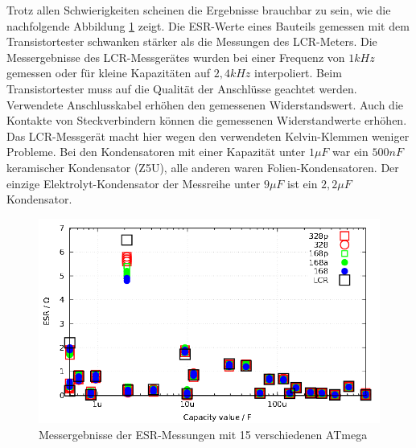 Trotz allen Schwierigkeiten scheinen die Ergebnisse brauchbar zu sein, wie die nachfolgende Abbildung \ref{fig:Cesr} zeigt.
Die ESR-Werte eines Bauteils gemessen mit dem Transistortester schwanken stärker als die Messungen des LCR-Meters.
Die Messergebnisse des LCR-Messgerätes wurden bei einer Frequenz von \(1kHz\) gemessen oder für kleine Kapazitäten auf
\(2,4kHz\) interpoliert.
Beim Transistortester muss auf die Qualität der Anschlüsse geachtet werden. Verwendete Anschlusskabel
erhöhen den gemessenen Widerstandswert. Auch die Kontakte von Steckverbindern können die gemessenen
Widerstandwerte erhöhen. Das LCR-Messgerät macht hier wegen den verwendeten Kelvin-Klemmen weniger Probleme.
Bei den Kondensatoren mit einer Kapazität unter \(1\mu F\) war ein \(500nF\) keramischer 
Kondensator (Z5U), alle anderen waren Folien-Kondensatoren. Der einzige Elektrolyt-Kondensator der Messreihe unter \(9\mu F\)  
ist ein \(2,2\mu F\) Kondensator.

\begin{figure}[H]
\centering
 \includegraphics[width=16cm]{../GNU/Cesr.pdf}
\caption{Messergebnisse der ESR-Messungen mit 15 verschiedenen ATmega}
\label{fig:Cesr}
\end{figure}

\newpage
